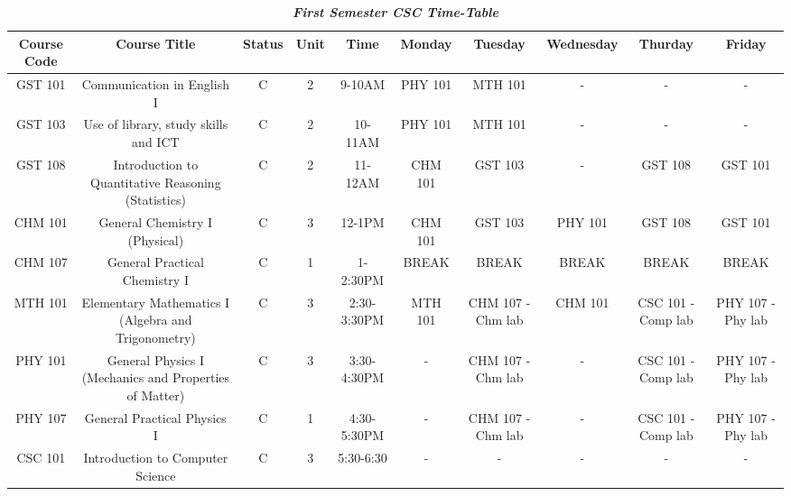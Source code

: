 \documentclass{article}
\begin{document}
	
\begin{sidewaystable}[h!]	
		\begin{center}
			\caption\textbf\textit{First Semester CSC Time-Table}
			\label{tab:table1}
			\begin{tabular}{c|c|c|c|c|c|c|c|c|c|}
				\hline
				\textbf{Course Code} & \textbf{Course Title} & \textbf{Status} & \textbf{Unit} & \textbf{Time} & \textbf{Monday} & \textbf{Tuesday} & \textbf{Wednesday} & \textbf{Thurday} & \textbf{Friday}\\
				\hline
				GST  101 & Communication in English I & C & 2 & 9-10AM & PHY 101 & MTH 101 & - & - & - \\
				\hline
				GST 103 & Use of library, study skills and ICT & C & 2 & 10-11AM & PHY 101 & MTH 101 & - & - & - \\
				\hline
				GST 108 & Introduction to Quantitative Reasoning (Statistics) & C & 2 & 11-12AM & CHM 101 & GST 103 & - & GST 108 & GST 101 \\
				\hline
				CHM 101 & General Chemistry I (Physical) & C & 3 & 12-1PM & CHM 101 & GST 103 & PHY 101 & GST 108 & GST 101 \\
				\hline
				CHM 107 & General Practical Chemistry I & C & 1 & 1-2:30PM & BREAK & BREAK & BREAK & BREAK & BREAK \\
				\hline
				MTH 101 & Elementary Mathematics I (Algebra and Trigonometry) & C & 3 & 2:30-3:30PM & MTH 101 & CHM 107 - Chm lab & CHM 101 & CSC 101 - Comp lab & PHY 107 - Phy lab \\
				\hline
				PHY 101 & General Physics I (Mechanics and Properties of Matter) & C & 3 & 3:30-4:30PM & - & CHM 107 - Chm lab & - & CSC 101 - Comp lab & PHY 107 - Phy lab \\
				\hline
				PHY 107 & General Practical Physics I & C & 1 & 4:30-5:30PM & - & CHM 107 - Chm lab & - & CSC 101 - Comp lab & PHY 107 - Phy lab \\
				\hline
				CSC 101 & Introduction to Computer Science & C & 3 & 5:30-6:30 & - & - & - & - & - \\
				\hline
				
				 \end{tabular}
		\end{center}
	\end{sidewaystable}
\end{document}
